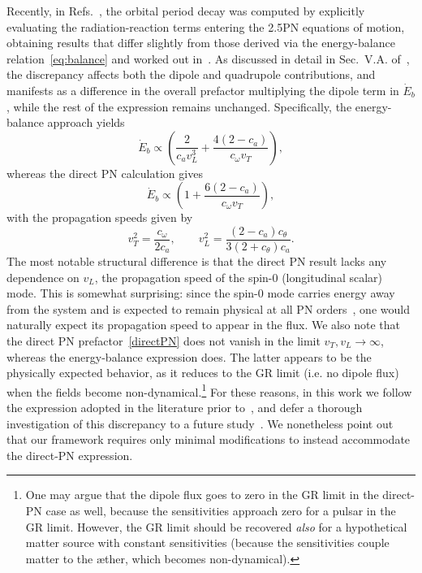 \documentclass[
    floats,
    floatfix,
    amssymb,
    prd,
    twocolumn,
    superscriptaddress,
    nofootinbib,
    unicode,
    colorlinks=true,
    linktocpage=true
]{revtex4-2}
\begin{document}
Recently, in Refs.~\cite{Taherasghari:2023rwn, Taherasghari:2025mlf}, the orbital period decay 
was computed by explicitly evaluating the radiation-reaction terms entering the 2.5PN equations 
of motion, obtaining results that differ slightly from those derived via the 
energy-balance relation~\eqref{eq:balance} and worked out in~\cite{Foster:2006az, Foster:2007gr, Yagi_2014}. As discussed in detail in 
Sec.~V.A. of~\cite{Taherasghari:2025mlf}, the discrepancy affects both the dipole and 
quadrupole contributions, and manifests as a difference in the overall prefactor 
multiplying the dipole term in $\dot{E}_b$, while the rest of the expression 
remains unchanged. Specifically, the energy-balance approach yields
%
\begin{equation}
    \dot{E}_b \propto \left(\frac{2}{c_a v_L^3} + \frac{4(2 - c_a)}{c_\omega v_T}\right),
\end{equation}
%
whereas the direct PN calculation gives
%
\begin{equation}\label{directPN}
    \dot{E}_b \propto \left(1 + \frac{6(2 - c_a)}{c_\omega v_T}\right),
\end{equation}
%
with the propagation speeds given by
%
\begin{equation}
    v_T^2 = \frac{c_\omega}{2c_a}, \qquad
    v_L^2 = \frac{(2 - c_a)c_\theta}{3(2 + c_\theta)c_a}.
\end{equation}
%
The most notable structural difference is that the direct PN result lacks any dependence 
on $v_L$, the propagation speed of the spin-0 (longitudinal scalar) mode. This is 
somewhat surprising: since the spin-0 mode carries energy away from the system and 
is expected to remain physical at all PN orders~\cite{Jacobson:2004ts,Garfinkle:2007bk,Franchini:2021bpt}, one would naturally expect its 
propagation speed to appear in the flux. We also note that the direct PN prefactor~\eqref{directPN} does not 
vanish in the limit $v_T, v_L \to \infty$, whereas the energy-balance expression does.
The latter appears to be the physically expected behavior, as it reduces to the GR limit (i.e. no dipole flux) when
the fields become non-dynamical.\footnote{One may argue that the dipole flux
goes to zero in the GR limit in the direct-PN case as well, because the sensitivities  approach zero for a pulsar in the GR limit. However, the GR limit should be recovered \textit{also} for a hypothetical matter source with constant sensitivities (because the sensitivities couple matter to the \ae ther, which becomes non-dynamical).
}
For these reasons, in this work we 
follow the expression adopted in the literature prior to~\cite{Taherasghari:2025mlf}, and defer a thorough investigation of this discrepancy to a future 
study~\cite{Aether_collapse}. We nonetheless point out that our framework requires only minimal 
modifications to instead accommodate the direct-PN expression.
\end{document}
